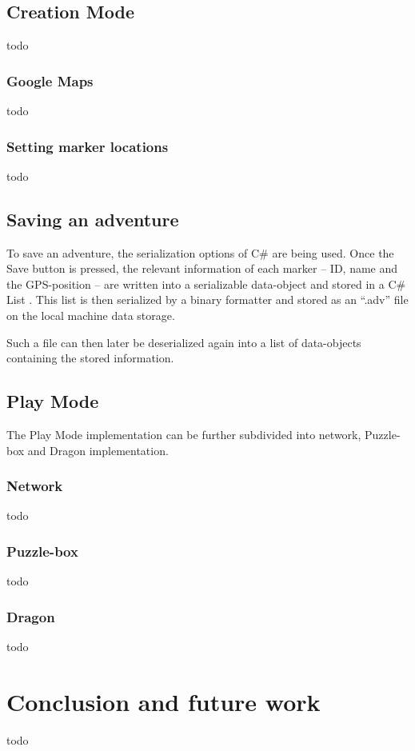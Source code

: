 \documentclass{sigchi-ext}
\begin{document}
\subsection{\textbf{Creation Mode}}
todo
\subsubsection{Google Maps}
todo
\subsubsection{Setting marker locations}
todo
\subsection{Saving an adventure}

To save an adventure, the serialization options of C\# \cite{serialization} are being used. Once the Save button is pressed, the relevant information of each marker -- ID, name and the GPS-position -- are written into a serializable data-object and stored in a C\# List \cite{listClass}. This list is then serialized by a binary formatter \cite{binaryFormatterClass} and stored as an ``.adv'' file on the local machine data storage.

Such a file can then later be deserialized again into a list of data-objects containing the stored information.

\subsection{\textbf{Play Mode}}

The Play Mode implementation can be further subdivided into network, Puzzle-box and Dragon implementation.

\subsubsection{Network}
todo

\subsubsection{Puzzle-box}
todo
\subsubsection{Dragon}
todo


\section{Conclusion and future work}
todo
\end{document}
